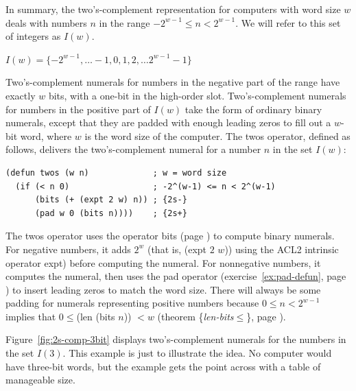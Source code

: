 In summary, the two's-complement representation for computers with
word size $w$ deals with numbers $n$ in the range
$-2^{w-1} \leq n < 2^{w-1}$.
We will refer to this set of integers as $I(w)$.\label{def-Iw}
\begin{center}
$I(w) = \{-2^{w-1}, \dots -1, 0, 1, 2, \dots 2^{w-1}-1\}$
\end{center}

Two's-complement numerals
for numbers in the negative part of the range
have exactly $w$ bits, with a one-bit in the high-order slot.
Two's-complement numerals for numbers in the positive part of $I(w)$
take the form of ordinary binary numerals, except that
they are padded with enough leading zeros
to fill out a $w$-bit word, where $w$ is the word size of the computer.
The \textsf{twos} operator, defined as follows, delivers the two's-complement numeral
for a number $n$ in the set $I(w)$:
\label{twos-defun}
\begin{code}
\begin{verbatim}
(defun twos (w n)             ; w = word size
  (if (< n 0)                 ; -2^(w-1) <= n < 2^(w-1)
      (bits (+ (expt 2 w) n)) ; {2s-}
      (pad w 0 (bits n))))    ; {2s+}
\end{verbatim}
\end{code}

The \textsf{twos} operator uses the operator \textsf{bits} (page \pageref{bits-defun})
to compute binary numerals.
For negative numbers, it adds $2^w$
(that is, \textsf{(expt $2$ $w$)})
using the ACL2 intrinsic operator \textsf{expt})
before computing the numeral.
For nonnegative numbers, it computes the numeral,
then uses the \textsf{pad} operator (exercise~\ref{ex:pad-defun}, page \pageref{ex:pad-defun})
to insert leading zeros to match the word size.
There will always be some padding for numerals representing
positive numbers because
$0 \le n < 2^{w-1}$ implies that
$0 \le $(len (bits $n$)) $< w$
(theorem \{\emph{len-bits}$\le$\}, page \pageref{len-bitsLE}).

Figure~\ref{fig:2s-comp-3bit} displays
two's-complement numerals for the numbers in the set $I(3)$.
This example is just to illustrate the idea.
No computer would have three-bit words,
but the example gets the point across with a table of manageable size.

